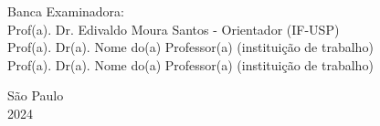 \begin{titlepage}
\noindent Banca Examinadora: \\
\noindent Prof(a). Dr. Edivaldo Moura Santos - Orientador (IF-USP) \\
Prof(a). Dr(a). Nome do(a) Professor(a) (institui\c{c}\~{a}o de trabalho) \\
Prof(a). Dr(a). Nome do(a) Professor(a) (institui\c{c}\~{a}o de trabalho) \\
\vspace{2.8cm}


\centering
    {São Paulo \\  2024}
\clearpage
\end{titlepage}

